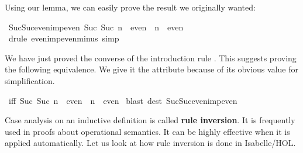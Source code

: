 \begin{isabellebody}
\begin{isamarkuptxt}
\medskip
Using our lemma, we can easily prove the result we originally wanted:%
\end{isamarkuptxt}%
\isamarkuptrue%
%
\endisatagproof
{\isafoldproof}%
%
\isadelimproof
%
\endisadelimproof
{}\isamarkupfalse%
\ Suc{}Suc{}even{}imp{}even{}\ {}Suc\ {}Suc\ n{}\ {}\ even\ {}\ n\ {}\ even{}\isanewline
%
\isadelimproof
%
\endisadelimproof
%
\isatagproof
{}\isamarkupfalse%
\ {}drule\ even{}imp{}even{}minus{}{}{}\ simp{}%
\endisatagproof
{\isafoldproof}%
%
\isadelimproof
%
\endisadelimproof
%
\begin{isamarkuptext}%
We have just proved the converse of the introduction rule .
This suggests proving the following equivalence.  We give it the
 attribute because of its obvious value for simplification.%
\end{isamarkuptext}%
\isamarkuptrue%
\isamarkupfalse%
\ {}iff{}{}\ {}{}{}Suc\ {}Suc\ n{}{}\ {}\ even{}\ {}\ {}n\ {}\ even{}{}\isanewline
%
\isadelimproof
%
\endisadelimproof
%
\isatagproof
{}\isamarkupfalse%
\ {}blast\ dest{}\ Suc{}Suc{}even{}imp{}even{}%
\endisatagproof
{\isafoldproof}%
%
\isadelimproof
%
\endisadelimproof
%
\isamarkuptrue%
%
\begin{isamarkuptext}%
%
Case analysis on an inductive definition is called \textbf{rule
inversion}.  It is frequently used in proofs about operational
semantics.  It can be highly effective when it is applied
automatically.  Let us look at how rule inversion is done in
Isabelle/HOL\@.


\end{isamarkuptext}
\end{isabellebody}
